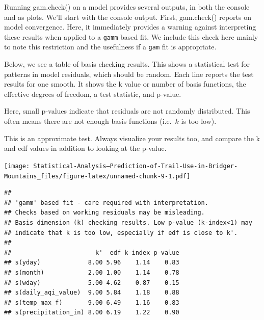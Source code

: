 \documentclass[
]{book}
\newenvironment{Shaded}{\begin{snugshade}}{\end{snugshade}}
\newcommand{\AttributeTok}[1]{\textcolor[rgb]{0.77,0.63,0.00}{#1}}
\newcommand{\CommentTok}[1]{\textcolor[rgb]{0.56,0.35,0.01}{\textit{#1}}}
\newcommand{\DecValTok}[1]{\textcolor[rgb]{0.00,0.00,0.81}{#1}}
\newcommand{\FunctionTok}[1]{\textcolor[rgb]{0.00,0.00,0.00}{#1}}
\newcommand{\NormalTok}[1]{#1}
\newcommand{\SpecialCharTok}[1]{\textcolor[rgb]{0.00,0.00,0.00}{#1}}
\begin{document}
Running gam.check() on a model provides several outputs, in both the console and as plots. We'll start with the console output. First, gam.check() reports on model convergence. Here, it immediately provides a warning against interpreting these results when applied to a \texttt{gamm} based fit. We include this check here mainly to note this restriction and the usefulness if a \texttt{gam} fit is appropriate.

Below, we see a table of basis checking results. This shows a statistical test for patterns in model residuals, which should be random. Each line reports the test results for one smooth. It shows the k value or number of basis functions, the effective degrees of freedom, a test statistic, and p-value.

Here, small p-values indicate that residuals are not randomly distributed. This often means there are not enough basis functions (i.e.~\(k\) is too low).

This is an approximate test. Always visualize your results too, and compare the k and edf values in addition to looking at the p-value.

\begin{Shaded}
\end{Shaded}

\texttt{[image: Statistical-Analysis--Prediction-of-Trail-Use-in-Bridger-Mountains\_files/figure-latex/unnamed-chunk-9-1.pdf]}

\begin{verbatim}
## 
## 'gamm' based fit - care required with interpretation.
## Checks based on working residuals may be misleading.
## Basis dimension (k) checking results. Low p-value (k-index<1) may
## indicate that k is too low, especially if edf is close to k'.
## 
##                       k'  edf k-index p-value
## s(yday)             8.00 5.96    1.14    0.83
## s(month)            2.00 1.00    1.14    0.78
## s(wday)             5.00 4.62    0.87    0.15
## s(daily_aqi_value)  9.00 5.84    1.18    0.88
## s(temp_max_f)       9.00 6.49    1.16    0.83
## s(precipitation_in) 8.00 6.19    1.22    0.90
\end{verbatim}
\end{document}
